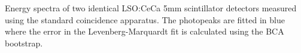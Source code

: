 \label{fig:photopeaks} Energy spectra of two identical LSO:CeCa 5mm scintillator detectors measured using the standard coincidence apparatus. The photopeaks are fitted in blue where the error in the Levenberg-Marquardt fit is calculated using the BCA bootstrap.